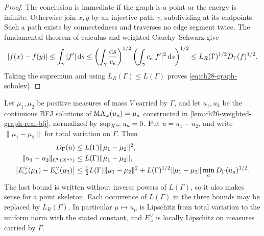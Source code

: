 \begin{proof}
The conclusion is immediate if the graph is a point or the energy is
infinite.  Otherwise join \(x,y\) by an injective path \(\gamma\),
subdividing at its endpoints.  Such a path exists by connectedness and
traverses no edge segment twice.  The fundamental theorem of calculus and
weighted Cauchy--Schwarz give
\[
 |f(x)-f(y)|
 \leq\int_\gamma|f'|\,\mathrm d s
 \leq\left(\int_\gamma\frac{\mathrm d s}{c_e}\right)^{1/2}
       \left(\int_\gamma c_e|f'|^2\,\mathrm d s\right)^{1/2}
 \leq L_R(\Gamma)^{1/2}D_\Gamma(f)^{1/2}.
\]
Taking the supremum and using \(L_R(\Gamma)\leq L(\Gamma)\) proves
\eqref{eq:ch28-graph-sobolev}.
\end{proof}

\begin{theorem}
\label{thm:ch28-curve-stability}
Let \(\mu_1,\mu_2\) be positive measures of mass \(V\) carried by
\(\Gamma\), and let \(u_1,u_2\) be the continuous BFJ solutions of
\(\operatorname{MA}_\omega(u_a)=\mu_a\) constructed in
\cref{lem:ch26-weighted-graph-real-bfj}, normalized by
\(\sup_{X^{\mathrm{an}}}u_a=0\).  Put \(u=u_1-u_2\), and write
\(\lVert\mu_1-\mu_2\rVert\) for total variation on \(\Gamma\).  Then
\begin{align}
\label{eq:ch28-curve-stability-dirichlet}
 D_\Gamma(u)&\leq L(\Gamma)\lVert\mu_1-\mu_2\rVert^2,\\
\label{eq:ch28-curve-stability-sup}
 \lVert u_1-u_2\rVert_{C^0(X^{\mathrm{an}})}
   &\leq L(\Gamma)\lVert\mu_1-\mu_2\rVert,\\
\label{eq:ch28-curve-stability-dual}
 \bigl|E^\vee_\omega(\mu_1)-E^\vee_\omega(\mu_2)\bigr|
   &\leq\tfrac12L(\Gamma)\lVert\mu_1-\mu_2\rVert^2
      +L(\Gamma)^{1/2}\lVert\mu_1-\mu_2\rVert
          \min_a D_\Gamma(u_a)^{1/2}.
\end{align}
The last bound is written without inverse powers of \(L(\Gamma)\),
so it also makes sense for a point skeleton.
Each occurrence of \(L(\Gamma)\) in the three bounds may be replaced
by \(L_R(\Gamma)\).  In particular \(\mu\mapsto u_\mu\) is Lipschitz
from total variation to the uniform norm with the stated constant, and
\(E^\vee_\omega\) is locally Lipschitz on measures carried by \(\Gamma\).
\end{theorem}

